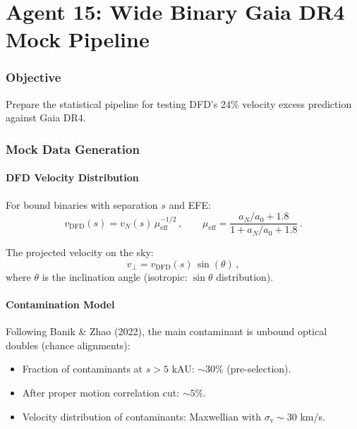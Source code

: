 \documentclass[11pt,a4paper]{article}
\begin{document}
\part{Agent 15: Wide Binary Gaia DR4 Mock Pipeline}
\label{part:gaia-mock}

\section{Objective}

Prepare the statistical pipeline for testing DFD's 24\% velocity excess prediction against Gaia DR4.

\section{Mock Data Generation}

\subsection{DFD Velocity Distribution}

For bound binaries with separation $s$ and EFE:
\begin{equation}
v_{\mathrm{DFD}}(s) = v_N(s)\,\mu_{\mathrm{eff}}^{-1/2}\,,\qquad \mu_{\mathrm{eff}} = \frac{a_N/a_0 + 1.8}{1 + a_N/a_0 + 1.8}\,.
\end{equation}

The projected velocity on the sky:
\begin{equation}
v_{\perp} = v_{\mathrm{DFD}}(s)\,\sin(\theta)\,,
\end{equation}
where $\theta$ is the inclination angle (isotropic: $\sin\theta$ distribution).

\subsection{Contamination Model}

Following Banik \& Zhao (2022), the main contaminant is unbound optical doubles (chance alignments):
\begin{itemize}
\item Fraction of contaminants at $s > 5$ kAU: $\sim 30\%$ (pre-selection).
\item After proper motion correlation cut: $\sim 5\%$.
\item Velocity distribution of contaminants: Maxwellian with $\sigma_v \sim 30$ km/s.
\end{itemize}
\end{document}
